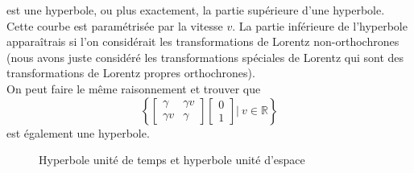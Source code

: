 \documentclass[a4paper,11pt]{report}
\theoremstyle{definition}
\theoremstyle{plain}
\theoremstyle{definition}
\theoremstyle{remark}
\newcommand{\x}{\times}
\renewcommand{\u}[1]{\underline{#1}}
\begin{document}
            est une hyperbole, ou plus exactement, la partie supérieure d'une hyperbole. Cette courbe est paramétrisée par la vitesse $v$. La partie inférieure de l'hyperbole apparaîtrais si l'on considérait les transformations de Lorentz non-orthochrones (nous avons juste considéré les transformations spéciales de Lorentz qui sont des transformations de Lorentz propres orthochrones).\\
            
            On peut faire le même raisonnement et trouver que 
            \begin{equation}
            \left\{ \begin{bmatrix}
                \gamma & \gamma v \\
                \gamma v & \gamma 
            \end{bmatrix}
            \begin{bmatrix}
                    0\\
                    1
            \end{bmatrix} \Bigg\vert~ v\in\mathbb{R}\right\}
            \end{equation}
            est également une hyperbole.
            
            \begin{figure}[H]
            \centering
            \caption{Hyperbole unité de temps et hyperbole unité d'espace}
            \label{fig:my_label}
            \end{figure}
            
\end{document}
